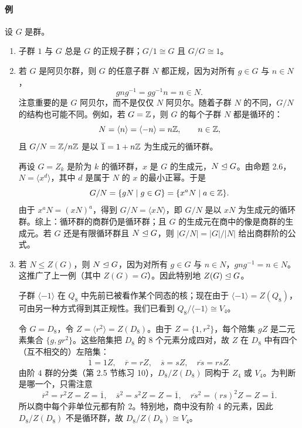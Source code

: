 \paragraph{例}
设 $G$ 是群。
\begin{enumerate}[label=(\arabic*)]
  \item 子群 $1$ 与 $G$ 总是 $G$ 的正规子群；$G/1\cong G$ 且 $G/G\cong1$。
  \item 若 $G$ 是阿贝尔群，则 $G$ 的任意子群 $N$ 都正规，因为对所有 $g\in G$ 与 $n\in N$，
  \[
    gng^{-1}=gg^{-1}n=n\in N.
  \]
  注意重要的是 $G$ 阿贝尔，而不是仅仅 $N$ 阿贝尔。随着子群 $N$ 的不同，$G/N$ 的结构也可能不同。例如，若 $G=\mathbb{Z}$，则 $G$ 的每个子群 $N$ 都是循环的：
  \[
    N=\langle n\rangle=\langle -n\rangle=n\mathbb{Z},
    \qquad n\in\mathbb{Z},
  \]
  且 $G/N=\mathbb{Z}/n\mathbb{Z}$ 是以 $\overline1=1+n\mathbb{Z}$ 为生成元的循环群。

  再设 $G=Z_k$ 是阶为 $k$ 的循环群，$x$ 是 $G$ 的生成元，$N\trianglelefteq G$。由命题 2.6，$N=\langle x^d\rangle$，其中 $d$ 是属于 $N$ 的 $x$ 的最小正幂。于是
  \[
    G/N=\{gN\mid g\in G\}=\{x^aN\mid a\in\mathbb{Z}\}.
  \]
  由于 $x^aN=(xN)^a$，得到 $G/N=\langle xN\rangle$，即 $G/N$ 是以 $xN$ 为生成元的循环群。综上：循环群的商群仍是循环群；且 $G$ 的生成元在商中的像是商群的生成元。若 $G$ 还是有限循环群且 $N\trianglelefteq G$，则 $|G/N|=|G|/|N|$ 给出商群阶的公式。
  \item 若 $N\leq Z(G)$，则 $N\trianglelefteq G$，因为对所有 $g\in G$ 与 $n\in N$，$gng^{-1}=n\in N$。这推广了上一例（其中 $Z(G)=G$）。因此特别地 $Z(G)\trianglelefteq G$。

  子群 $\langle -1\rangle$ 在 $Q_8$ 中先前已被看作某个同态的核；现在由于 $\langle -1\rangle=Z(Q_8)$，可由另一种方式得到其正规性。我们已看到 $Q_8/\langle -1\rangle\cong V_4$。

  令 $G=D_8$，令 $Z=\langle r^2\rangle=Z(D_8)$。由于 $Z=\{1,r^2\}$，每个陪集 $gZ$ 是二元素集合 $\{g,gr^2\}$。这些陪集把 $D_8$ 的 $8$ 个元素分成四对，故 $Z$ 在 $D_8$ 中有四个（互不相交的）左陪集：
  \[
    \overline1=1Z,\quad \overline r=rZ,
    \quad \overline s=sZ,
    \quad \overline{rs}=rsZ.
  \]
  由阶 $4$ 群的分类（第 2.5 节练习 10），$D_8/Z(D_8)$ 同构于 $Z_4$ 或 $V_4$。为判断是哪一个，只需注意
  \[
    \overline r^2=r^2Z=Z=\overline1,
    \quad \overline s^2=s^2Z=Z=\overline1,
    \quad \overline{rs}^2=(rs)^2Z=Z=\overline1.
  \]
  所以商中每个非单位元都有阶 $2$。特别地，商中没有阶 $4$ 的元素，因此 $D_8/Z(D_8)$ 不是循环群，故 $D_8/Z(D_8)\cong V_4$。
\end{enumerate}


